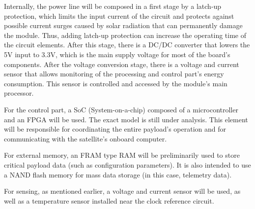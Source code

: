 Internally, the power line will be composed in a first stage by a latch-up protection, which limits the input current of the circuit and protects against possible current surges caused by solar radiation that can permanently damage the module. Thus, adding latch-up protection can increase the operating time of the circuit elements. After this stage, there is a DC/DC converter that lowers the 5V input to 3.3V, which is the main supply voltage for most of the board's components. After the voltage conversion stage, there is a voltage and current sensor that allows monitoring of the processing and control part's energy consumption. This sensor is controlled and accessed by the module's main processor.


For the control part, a SoC (System-on-a-chip) composed of a microcontroller and an FPGA will be used. The exact model is still under analysis. This element will be responsible for coordinating the entire payload's operation and for communicating with the satellite's onboard computer.


For external memory, an FRAM type RAM will be preliminarily used to store critical payload data (such as configuration parameters). It is also intended to use a NAND flash memory for mass data storage (in this case, telemetry data).


For sensing, as mentioned earlier, a voltage and current sensor will be used, as well as a temperature sensor installed near the clock reference circuit.


